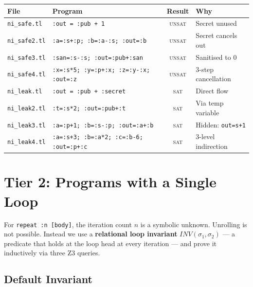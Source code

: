 \documentclass[11pt,a4paper]{article}
\begin{document}
\begin{table}[h!]
\centering\small
\begin{tabular}{llcp{5.5cm}}
\toprule
\textbf{File} & \textbf{Program} & \textbf{Result} & \textbf{Why} \\
\midrule
\texttt{ni\_safe.tl}  & \texttt{:out = :pub + 1}                              & \textsc{unsat} & Secret unused \\
\texttt{ni\_safe2.tl} & \texttt{:a=:s+:p; :b=:a-:s; :out=:b}                 & \textsc{unsat} & Secret cancels out \\
\texttt{ni\_safe3.tl} & \texttt{:san=:s-:s; :out=:pub+:san}                   & \textsc{unsat} & Sanitised to 0 \\
\texttt{ni\_safe4.tl} & \texttt{:x=:s*5; :y=:p+:x; :z=:y-:x; :out=:z}       & \textsc{unsat} & 3-step cancellation \\
\midrule
\texttt{ni\_leak.tl}  & \texttt{:out = :pub + :secret}                        & \textsc{sat}   & Direct flow \\
\texttt{ni\_leak2.tl} & \texttt{:t=:s*2; :out=:pub+:t}                        & \textsc{sat}   & Via temp variable \\
\texttt{ni\_leak3.tl} & \texttt{:a=:p+1; :b=:s-:p; :out=:a+:b}               & \textsc{sat}   & Hidden: \texttt{out=s+1} \\
\texttt{ni\_leak4.tl} & \texttt{:a=:s+3; :b=:a*2; :c=:b-6; :out=:p+:c}      & \textsc{sat}   & 3-level indirection \\
\bottomrule
\end{tabular}
\end{table}

\section{Tier 2: Programs with a Single Loop}

For \texttt{repeat :n [body]}, the iteration count $n$ is a symbolic unknown.
Unrolling is not possible. Instead we use a \textbf{relational loop invariant}
$\mathit{INV}(\sigma_1, \sigma_2)$ — a predicate that holds at the loop head at
every iteration — and prove it inductively via three Z3 queries.

\subsection*{Default Invariant}
\end{document}
